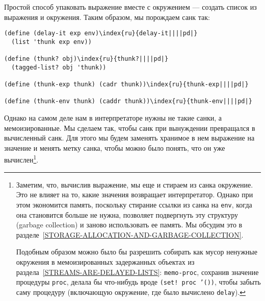 Простой способ упаковать выражение вместе с окружением
--- создать список из выражения и окружения.  Таким образом, мы
порождаем санк так:

\begin{Verbatim}[fontsize=\small]
(define (delay-it exp env)\index{ru}{delay-it||||pd|}
  (list 'thunk exp env))

(define (thunk? obj)\index{ru}{thunk?||||pd|}
  (tagged-list? obj 'thunk))

(define (thunk-exp thunk) (cadr thunk))\index{ru}{thunk-exp||||pd|}

(define (thunk-env thunk) (caddr thunk))\index{ru}{thunk-env||||pd|}
\end{Verbatim}

Однако на самом деле нам в интерпретаторе нужны не
такие санки, а мемоизированные. Мы сделаем так, чтобы санк при
вынуждении превращался в вычисленный санк. Для этого мы будем заменять
хранимое в нем выражение на
значение и менять метку санка, чтобы можно было понять, что он уже
вычислен\footnote{Заметим, что, вычислив выражение, мы еще и стираем из
санка окружение.  Это не влияет на то, какие значения возвращает
интерпретатор.  Однако при этом экономится память,
поскольку стирание ссылки из санка на {\tt env}, когда она становится
больше не нужна, позволяет подвергнуть эту структуру
 (garbage
collection) и заново использовать ее память.  Мы обсудим это в 
разделе~\ref{STORAGE-ALLOCATION-AND-GARBAGE-COLLECTION}.

Подобным образом можно было бы разрешить собирать как мусор 
ненужные окружения в мемоизированных задержанных объектах из
раздела~\ref{STREAMS-ARE-DELAYED-LISTS}:
{\tt memo-proc}, сохранив значение процедуры {\tt proc}, делала бы
что-нибудь вроде {\tt (set! proc '())}, чтобы забыть саму процедуру
(включающую окружение, где было вычислено {\tt delay}).}.

